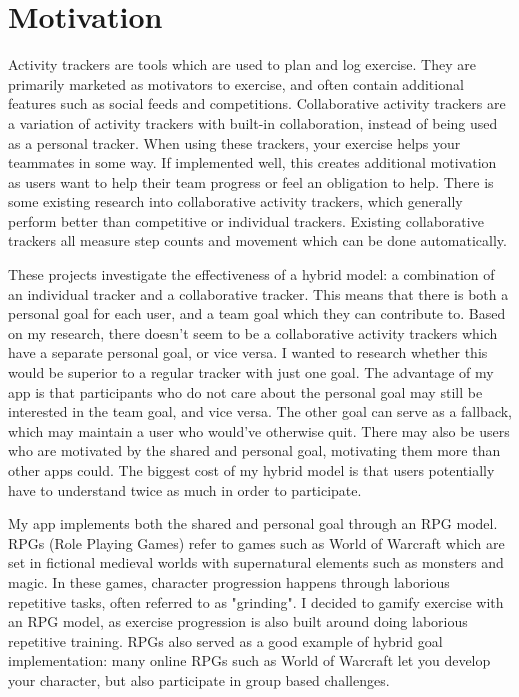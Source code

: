 \documentclass{l4proj}
\begin{document}
\section{Motivation}

Activity trackers are tools which are used to plan and log exercise. They are primarily marketed as motivators to exercise, and often contain additional features such as social feeds and competitions. Collaborative activity trackers are a variation of activity trackers with built-in collaboration, instead of being used as a personal tracker. When using these trackers, your exercise helps your teammates in some way. If implemented well, this creates additional motivation as users want to help their team progress or feel an obligation to help. There is some existing research into collaborative activity trackers, which generally perform better than competitive or individual trackers. Existing collaborative trackers all measure step counts and movement which can be done automatically. 

These projects investigate the effectiveness of a hybrid model: a combination of an individual tracker and a collaborative tracker. This means that there is both a personal goal for each user, and a team goal which they can contribute to. Based on my research, there doesn't seem to be a collaborative activity trackers which have a separate personal goal, or vice versa. I wanted to research whether this would be superior to a regular tracker with just one goal. The advantage of my app is that participants who do not care about the personal goal may still be interested in the team goal, and vice versa. The other goal can serve as a fallback, which may maintain a user who would've otherwise quit. There may also be users who are motivated by the shared and personal goal, motivating them more than other apps could. The biggest cost of my hybrid model is that users potentially have to understand twice as much in order to participate. 

My app implements both the shared and personal goal through an RPG model. RPGs (Role Playing Games) refer to games such as World of Warcraft which are set in fictional medieval worlds with supernatural elements such as monsters and magic. In these games, character progression happens through laborious repetitive tasks, often referred to as "grinding". I decided to gamify exercise with an RPG model, as exercise progression is also built around doing laborious repetitive training. RPGs also served as a good example of hybrid goal implementation: many online RPGs such as World of Warcraft let you develop your character, but also participate in group based challenges.
\end{document}

